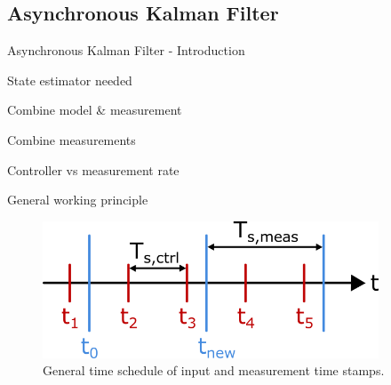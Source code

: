 \subsection{Asynchronous Kalman Filter}
\label{subsec:Kalman}


\begin{frame}{Asynchronous Kalman Filter - Introduction}
    \bit[label=\raisebox{0.25ex}{\tiny$\bullet$}]
        \item State estimator needed
        \vspace{5mm}
        \item Combine model \& measurement
        \vspace{5mm}
        \item Combine measurements
        \vspace{5mm}
        \item Controller vs measurement rate
    \eit
    		
\end{frame}


\begin{frame}{General working principle}

    \begin{figure}[h]
    \centering
    \includegraphics[width=10cm]{Figures/Kalman_general.png}
    \caption{General time schedule of input and measurement time stamps.}
    \label{fig:kalman_gen}
    \end{figure}
    		
\end{frame}